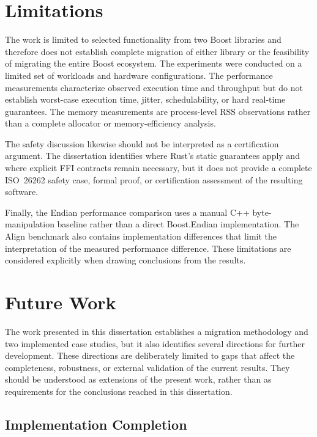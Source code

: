 \section{Limitations}
\label{sec:limitations}

The work is limited to selected functionality from two Boost libraries and therefore does not establish complete migration of either library or the feasibility of migrating the entire Boost ecosystem. The experiments were conducted on a limited set of workloads and hardware configurations. The performance measurements characterize observed execution time and throughput but do not establish worst-case execution time, jitter, schedulability, or hard real-time guarantees. The memory measurements are process-level RSS observations rather than a complete allocator or memory-efficiency analysis.

The safety discussion likewise should not be interpreted as a certification argument. The dissertation identifies where Rust's static guarantees apply and where explicit FFI contracts remain necessary, but it does not provide a complete ISO~26262 safety case, formal proof, or certification assessment of the resulting software.

Finally, the Endian performance comparison uses a manual C++ byte-manipulation baseline rather than a direct Boost.Endian implementation. The Align benchmark also contains implementation differences that limit the interpretation of the measured performance difference. These limitations are considered explicitly when drawing conclusions from the results.

\section{Future Work}
\label{sec:future_work}

The work presented in this dissertation establishes a migration methodology and
two implemented case studies, but it also identifies several directions for
further development. These directions are deliberately limited to gaps that
affect the completeness, robustness, or external validation of the current
results. They should be understood as extensions of the present work, rather
than as requirements for the conclusions reached in this dissertation.

\subsection{Implementation Completion}

